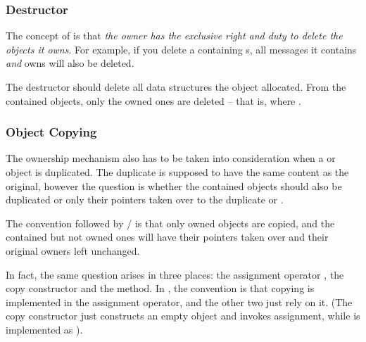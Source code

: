 \subsubsection{Destructor}

The concept of  is that \textit{the owner has the
exclusive right and duty to delete the objects it owns}.
For example, if you delete a  containing s,
all messages it contains \textit{and} owns will also be deleted.

The destructor should delete all data structures the object allocated.
From the contained objects, only the owned ones are deleted -- that is,
where .


\subsubsection{Object Copying}

The ownership mechanism also has to be taken into consideration
when a  or  object is duplicated.
The duplicate is supposed to have the same content as the
original, however the question is whether the contained objects
should also be duplicated or only their pointers taken over
to the duplicate  or .

The convention followed by / is that
only owned objects are copied, and the contained but not owned ones
will have their pointers taken over and their original owners
left unchanged.

In fact, the same question arises in three places:
the assignment operator , the copy constructor
and the  method.
In {\opp}, the convention is that copying is implemented
in the assignment operator, and the other two just rely on it.
(The copy constructor just constructs an empty object and
invokes assignment, while 
is implemented as ).

%
%
%
%
%
%
%


